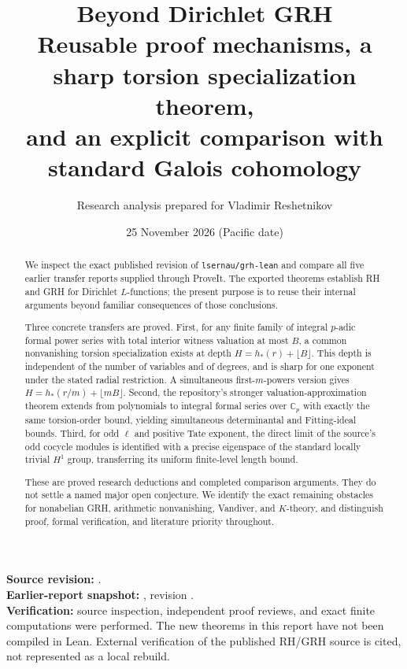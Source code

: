 \documentclass[11pt,letterpaper]{article}
\title{\textbf{Beyond Dirichlet GRH}\\[0.4em]
\large Reusable proof mechanisms, a sharp torsion specialization theorem,\\
and an explicit comparison with standard Galois cohomology}
\author{Research analysis prepared for Vladimir Reshetnikov}
\date{25 November 2026 \quad (Pacific date)}
\theoremstyle{remark}
\newcommand{\C}{\mathbb C}
\begin{document}
\maketitle
\thispagestyle{empty}

\begin{abstract}
We inspect the exact published revision of \texttt{lsernau/grh-lean} and
compare all five earlier transfer reports supplied through ProveIt. The
exported theorems establish RH and GRH for Dirichlet $L$-functions; the
present purpose is to reuse their internal arguments beyond familiar
consequences of those conclusions.

Three concrete transfers are proved. First, for any finite family of
integral $p$-adic formal power series with total interior witness valuation
at most $B$, a common nonvanishing torsion specialization exists at depth
$H=h_*(r)+\lfloor B\rfloor$. This depth is independent of the number of
variables and of degrees, and is sharp for one exponent under the stated
radial restriction. A simultaneous first-$m$-powers version gives
$H=h_*(r/m)+\lfloor mB\rfloor$. Second, the repository's stronger
valuation-approximation theorem extends from polynomials to integral formal
series over $\C_p$ with exactly the same torsion-order bound, yielding
simultaneous determinantal and Fitting-ideal bounds. Third, for odd $\ell$
and positive Tate exponent, the direct limit of the source's odd cocycle
modules is identified with a precise eigenspace of the standard locally
trivial $H^1$ group, transferring its uniform finite-level length bound.

These are proved research deductions and completed comparison arguments.
They do not settle a named major open conjecture. We identify the exact
remaining obstacles for nonabelian GRH, arithmetic nonvanishing, Vandiver,
and $K$-theory, and distinguish proof, formal verification, and literature
priority throughout.
\end{abstract}

\vfill
\small
\textbf{Source revision:}
.\\
\textbf{Earlier-report snapshot:}
, revision
.\\
\textbf{Verification:} source inspection, independent proof reviews, and
exact finite computations were performed. The new theorems in this report
have not been compiled in Lean. External verification of the published
RH/GRH source is cited, not represented as a local rebuild.
\normalsize
\newpage
\tableofcontents
\newpage
\end{document}
